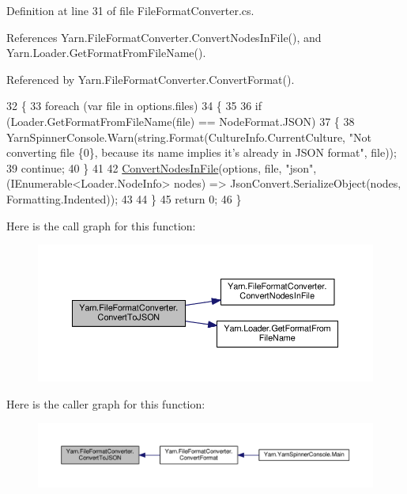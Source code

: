 Definition at line 31 of file File\-Format\-Converter.\-cs.



References Yarn.\-File\-Format\-Converter.\-Convert\-Nodes\-In\-File(), and Yarn.\-Loader.\-Get\-Format\-From\-File\-Name().



Referenced by Yarn.\-File\-Format\-Converter.\-Convert\-Format().


\begin{DoxyCode}
32         \{
33             \textcolor{keywordflow}{foreach} (var file \textcolor{keywordflow}{in} options.files)
34             \{
35 
36                 \textcolor{keywordflow}{if} (Loader.GetFormatFromFileName(file) == NodeFormat.JSON)
37                 \{
38                     YarnSpinnerConsole.Warn(string.Format(CultureInfo.CurrentCulture, \textcolor{stringliteral}{"Not converting file
       \{0\}, because its name implies it's already in JSON format"}, file));
39                     \textcolor{keywordflow}{continue};
40                 \}
41 
42                 \hyperlink{a00105_aa72838be584177b5592c31d73c0febdb}{ConvertNodesInFile}(options, file, \textcolor{stringliteral}{"json"}, (IEnumerable<Loader.NodeInfo> 
      nodes) => JsonConvert.SerializeObject(nodes, Formatting.Indented));
43 
44             \}
45             \textcolor{keywordflow}{return} 0;
46         \}
\end{DoxyCode}


Here is the call graph for this function\-:
\nopagebreak
\begin{figure}[H]
\begin{center}
\leavevmode
\includegraphics[width=350pt]{a00105_a28a086a7b44ecea7430af40436f38df6_cgraph}
\end{center}
\end{figure}




Here is the caller graph for this function\-:
\nopagebreak
\begin{figure}[H]
\begin{center}
\leavevmode
\includegraphics[width=350pt]{a00105_a28a086a7b44ecea7430af40436f38df6_icgraph}
\end{center}
\end{figure}


